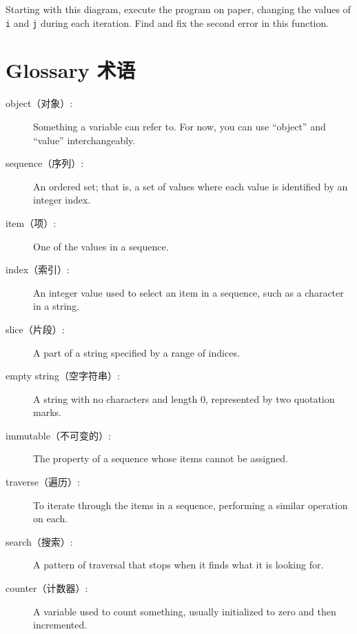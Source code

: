 \documentclass[10pt]{book}
\begin{document}
\begin{CJK}{UTF8}{gbsn}
\begin{exercise}
\label{isreverse}

Starting with this diagram, execute the program on paper, changing the
values of {\tt i} and {\tt j} during each iteration.  Find and fix the
second error in this function.

\end{exercise}



\section{Glossary 术语}

\begin{description}

\item[object（对象）:] Something a variable can refer to.  For now,
you can use ``object'' and ``value'' interchangeably.

\item[sequence（序列）:] An ordered set; that is, a set of
values where each value is identified by an integer index.

\item[item（项）:] One of the values in a sequence.

\item[index（索引）:] An integer value used to select an item in
a sequence, such as a character in a string.

\item[slice（片段）:] A part of a string specified by a range of indices.

\item[empty string（空字符串）:] A string with no characters and length 0, represented
by two quotation marks.

\item[immutable（不可变的）:] The property of a sequence whose items cannot
be assigned.

\item[traverse（遍历）:] To iterate through the items in a sequence,
performing a similar operation on each.

\item[search（搜索）:] A pattern of traversal that stops
when it finds what it is looking for.

\item[counter（计数器）:] A variable used to count something, usually initialized
to zero and then incremented.


\end{description}
\end{CJK}
\end{document}
